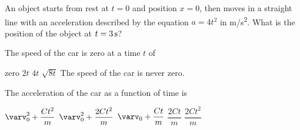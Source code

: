 \documentclass{../../oss-classkick-exam}
\begin{document}
\begin{multicols*}{2}
\begin{questions}

    \question An object starts from rest at $t=0$ and position $x=0$, then moves
    in a straight line with an acceleration described by the equation $a=4t^2$
    in \si{m/s^2}. What is the position of the object at $t=\SI3\second$?
    

    \question The speed of the car is zero at a time $t$ of
    \begin{choices}
      \choice zero
      \choice $2t$
      \choice $4t$
      \choice $\sqrt{8t}$
      \choice The speed of the car is never zero.
    \end{choices}
    \vspace{.65in}
    \label{car1}
    
    \question The acceleration of the car as a function of time is
    \begin{choices}
      \choice $\varv_0^2+\dfrac{Ct^2}m$
      \choice $\varv_0^2+\dfrac{2Ct^2}m$
      \choice $\varv_0+\dfrac{Ct}m$
      \choice $\dfrac{2Ct}m$
      \choice $\dfrac{2Ct^2}m$
    \end{choices}
    \label{car2}
  

\end{questions}
\end{multicols*}
\end{document}

